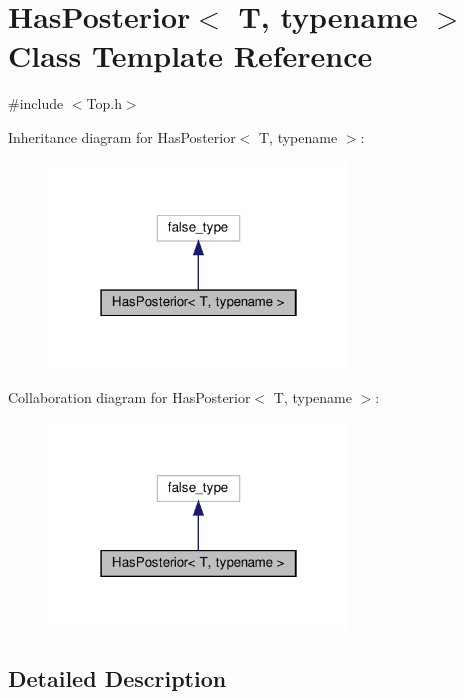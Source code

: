 \hypertarget{struct_has_posterior}{}\section{Has\+Posterior$<$ T, typename $>$ Class Template Reference}
\label{struct_has_posterior}


{\ttfamily \#include $<$Top.\+h$>$}



Inheritance diagram for Has\+Posterior$<$ T, typename $>$\+:
\nopagebreak
\begin{figure}[H]
\begin{center}
\leavevmode
\includegraphics[width=226pt]{struct_has_posterior__inherit__graph}
\end{center}
\end{figure}


Collaboration diagram for Has\+Posterior$<$ T, typename $>$\+:
\nopagebreak
\begin{figure}[H]
\begin{center}
\leavevmode
\includegraphics[width=226pt]{struct_has_posterior__coll__graph}
\end{center}
\end{figure}


\subsection{Detailed Description}
